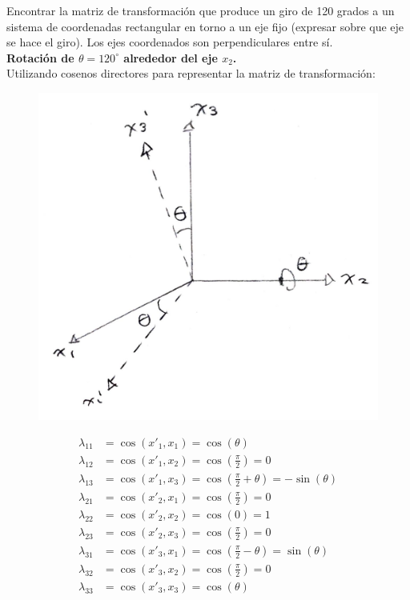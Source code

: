 Encontrar la matriz de transformación que produce un giro de 120 grados a un sistema de 
coordenadas rectangular en torno a un eje fijo (expresar sobre que eje se hace el giro). 
Los ejes coordenados son perpendiculares entre sí.\\

\textbf{Rotación de $\theta = 120^\circ$ alrededor del eje $x_{2}$.}\\
Utilizando cosenos directores para representar la matriz de transformación:

\begin{figure}[h]
    \centering
    \includegraphics[scale=0.15]{eje_coordenado.jpeg}
\end{figure}

\begin{align*}
    \lambda_{11} &= \cos(x'_{1},x_{1}) = \cos(\theta) \\
    \lambda_{12} &= \cos(x'_{1},x_{2}) = \cos\left(\frac{\pi}{2}\right) = 0 \\
    \lambda_{13} &= \cos(x'_{1},x_{3}) = \cos\left(\frac{\pi}{2}+\theta\right) = -\sin(\theta) \\
    \lambda_{21} &= \cos(x'_{2},x_{1}) = \cos\left(\frac{\pi}{2}\right) = 0 \\
    \lambda_{22} &= \cos(x'_{2},x_{2}) = \cos(0) = 1 \\
    \lambda_{23} &= \cos(x'_{2},x_{3}) = \cos\left(\frac{\pi}{2}\right) = 0 \\
    \lambda_{31} &= \cos(x'_{3},x_{1}) = \cos\left(\frac{\pi}{2}-\theta\right) = \sin(\theta) \\
    \lambda_{32} &= \cos(x'_{3},x_{2}) = \cos\left(\frac{\pi}{2}\right) = 0 \\
    \lambda_{33} &= \cos(x'_{3},x_{3}) = \cos(\theta) 
\end{align*}

